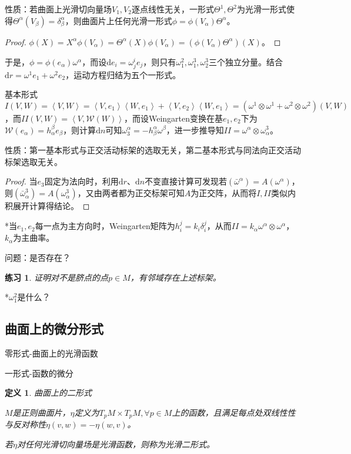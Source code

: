 \documentclass[a4paper,UTF8,fontset=windows]{ctexart}
\newtheorem{dfn}[thm]{定义}
\newtheorem*{hw}{练习}
\begin{document}
性质：若曲面上光滑切向量场$V_1,V_2$逐点线性无关，一形式$\Theta^1,\Theta^2$为光滑一形式使得$\Theta^\alpha(V_\beta)=\delta_\beta^\alpha$，则曲面片上任何光滑一形式$\phi=\phi(V_\alpha)\Theta^\alpha$。

\begin{proof}
$\phi(X)=X^\alpha\phi(V_\alpha)=\Theta^\alpha(X)\phi(V_\alpha)=(\phi(V_\alpha)\Theta^\alpha)(X)$。
\end{proof}

于是，$\phi=\phi(e_\alpha)\omega^\alpha$，而设$\mathrm{d}e_i=\omega_j^ie_j$，则只有$\omega_1^2,\omega_1^3,\omega_2^3$三个独立分量。结合$\mathrm{d}r=\omega^1e_1+\omega^2e_2$，运动方程归结为五个一形式。

基本形式$I(V,W)=\left<V,W\right>=\left<V,e_1\right>\left<W,e_1\right>+\left<V,e_2\right>\left<W,e_1\right>=(\omega^1\otimes\omega^1+\omega^2\otimes\omega^2)(V,W)$，而$II(V,W)=\left<V,\mathcal{W}(W)\right>$，而设Weingarten变换在基$e_1,e_2$下为$\mathcal{W}(e_\alpha)=h_\alpha^\beta e_\beta$，则计算$\mathrm{d}n$可知$\omega^\alpha_3=-h_\beta^\alpha\omega^\beta$，进一步推导知$II=\omega^\alpha\otimes\omega_\alpha^3$。

性质：第一基本形式与正交活动标架的选取无关，第二基本形式与同法向正交活动标架选取无关。

\begin{proof}
当$e_3$固定为法向时，利用$\mathrm{d}r$、$\mathrm{d}n$不变直接计算可发现若$(\bar{\omega}^\alpha)=A(\omega^\alpha)$，则$(\bar{\omega}^3_\alpha)=A(\omega^3_\alpha)$，又由两者都为正交标架可知$A$为正交阵，从而将$I,II$类似内积展开计算得结论。
\end{proof}

*当$e_1,e_2$每一点为主方向时，Weingarten矩阵为$h_i^j=k_i\delta_i^j$，从而$II=k_\alpha\omega^\alpha\otimes\omega^\alpha$，$k_\alpha$为主曲率。

问题：是否存在？

\begin{hw}
证明对不是脐点的点$p\in M$，有邻域存在上述标架。
\end{hw}

*$\omega_1^2$是什么？

\subsection{曲面上的微分形式}

零形式-曲面上的光滑函数

一形式-函数的微分

\begin{dfn} 曲面上的二形式

$M$是正则曲面片，$\eta$定义为$T_pM\times T_pM,\forall p\in M$上的函数，且满足每点处双线性性与反对称性$\eta(v,w)=-\eta(w,v)$。

若$\eta$对任何光滑切向量场是光滑函数，则称为光滑二形式。
\end{dfn}
\end{document}
